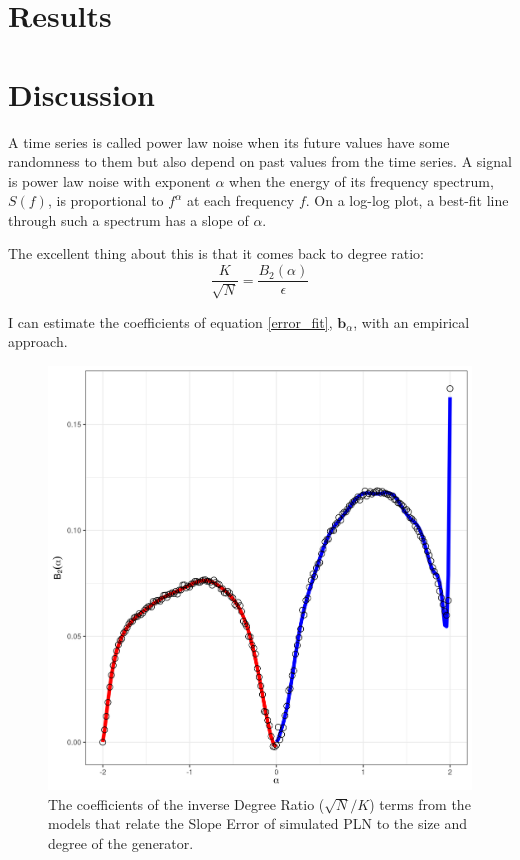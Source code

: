 \documentclass[preprint]{JASA}
\begin{document}
\section{Results}
\section*{Discussion}

A time series is called power law noise when its future values have some randomness to them but also depend on past values from the time series.
A signal is power law noise with exponent $\alpha$ when the energy of its frequency spectrum, $S(f)$, is proportional to $f^{\alpha}$ at each frequency $f$.
On a log-log plot, a best-fit line through such a spectrum has a slope of $\alpha$.

The excellent thing about this is that it comes back to degree ratio: 
\begin{equation}
  \frac{K}{\sqrt{N}} = \frac{B_2(\alpha)}{\epsilon}
\end{equation}

I can estimate the coefficients of equation \ref{error_fit}, $\mathbf{b}_{\alpha}$, with an empirical approach.

\begin{figure}[ht]
  \includegraphics[width=\reprintcolumnwidth]{Figure3}
  \caption{\label{fig:DegreeRatioCoefs}{
      The coefficients of the inverse Degree Ratio ($\sqrt{N}/K$) terms from
      the models that relate the Slope Error of simulated PLN to the size and
      degree of the generator.
    }}
\end{figure}
\end{document}
